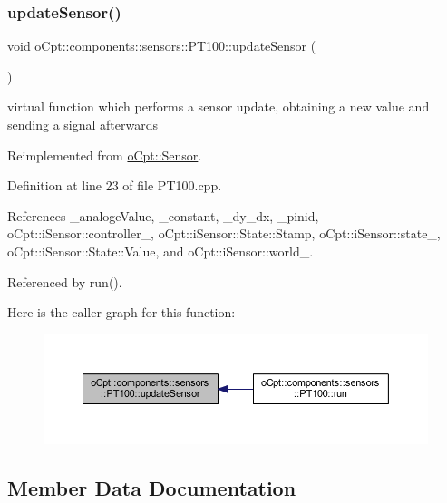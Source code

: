\subsubsection{\texorpdfstring{update\+Sensor()}{updateSensor()}}
{\footnotesize\ttfamily void o\+Cpt\+::components\+::sensors\+::\+P\+T100\+::update\+Sensor (\begin{DoxyParamCaption}{ }\end{DoxyParamCaption})\hspace{0.3cm}{\ttfamily [virtual]}}

virtual function which performs a sensor update, obtaining a new value and sending a signal afterwards 

Reimplemented from \hyperlink{classo_cpt_1_1_sensor_ab4b0dedb06f11bcf2368852035beb2b2}{o\+Cpt\+::\+Sensor}.



Definition at line 23 of file P\+T100.\+cpp.



References \+\_\+analoge\+Value, \+\_\+constant, \+\_\+dy\+\_\+dx, \+\_\+pinid, o\+Cpt\+::i\+Sensor\+::controller\+\_\+, o\+Cpt\+::i\+Sensor\+::\+State\+::\+Stamp, o\+Cpt\+::i\+Sensor\+::state\+\_\+, o\+Cpt\+::i\+Sensor\+::\+State\+::\+Value, and o\+Cpt\+::i\+Sensor\+::world\+\_\+.



Referenced by run().

Here is the caller graph for this function\+:\nopagebreak
\begin{figure}[H]
\begin{center}
\leavevmode
\includegraphics[width=350pt]{classo_cpt_1_1components_1_1sensors_1_1_p_t100_a66619675288a5344a55242d9bf097aee_icgraph}
\end{center}
\end{figure}


\subsection{Member Data Documentation}
\hypertarget{classo_cpt_1_1components_1_1sensors_1_1_p_t100_aeb98d92a8864ca202bcc7f382a6053c0}{}\label{classo_cpt_1_1components_1_1sensors_1_1_p_t100_aeb98d92a8864ca202bcc7f382a6053c0} 
